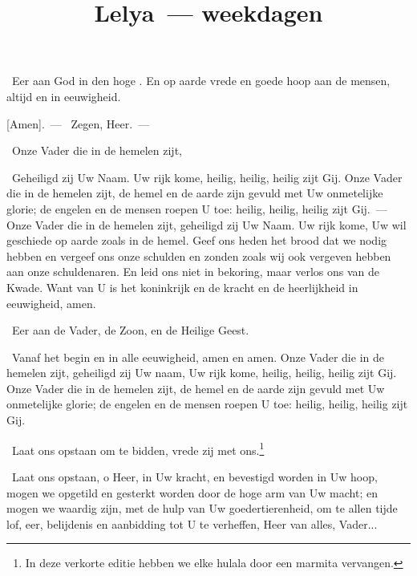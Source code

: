 \documentclass[12pt,twoside,a5paper]{article}
\begin{document}
\title{Lelya~--- weekdagen}
\author{}
\date{}
\maketitle

\footnotelayout{\ }


\begin{halfparskip}
  \cc~Eer aan God in den hoge . En op aarde vrede en goede hoop aan de mensen, altijd en in eeuwigheid.

  [Amen].~--- \rr~Zegen, Heer.~--- 

  \cc~Onze Vader die in de hemelen zijt,

  \rr~Geheiligd zij Uw Naam. Uw rijk kome, heilig, heilig, heilig zijt Gij. Onze Vader die in de hemelen zijt, de hemel en de aarde zijn gevuld met Uw onmetelijke glorie; de engelen en de mensen roepen U toe: heilig, heilig, heilig zijt Gij.~--- Onze Vader die in de hemelen zijt, geheiligd zij Uw Naam. Uw rijk kome, Uw wil geschiede op aarde zoals in de hemel. Geef ons heden het brood dat we nodig hebben en vergeef ons onze schulden en zonden zoals wij ook vergeven hebben aan onze schuldenaren. En leid ons niet in bekoring, maar verlos ons van de Kwade. Want van U is het koninkrijk en de kracht en de heerlijkheid in eeuwigheid, amen.

  \cc~Eer aan de Vader, de Zoon, en de Heilige Geest.

  \rr~Vanaf het begin en in alle eeuwigheid, amen en amen. Onze Vader die in de hemelen zijt, geheiligd zij Uw naam, Uw rijk kome, heilig, heilig, heilig zijt Gij. Onze Vader die in de hemelen zijt, de hemel en de aarde zijn gevuld met Uw onmetelijke glorie; de engelen en de mensen roepen U toe: heilig, heilig, heilig zijt Gij.

  \dd~Laat ons opstaan om te bidden, vrede zij met ons.\footnote{In deze verkorte editie hebben we elke hulala door een marmita vervangen.}

  \cc~Laat ons opstaan, o Heer, in Uw kracht, en bevestigd worden in Uw hoop, mogen we opgetild en gesterkt worden door de hoge arm van Uw macht; en mogen we waardig zijn, met de hulp van Uw goedertierenheid, om te allen tijde lof, eer, belijdenis en aanbidding tot U te verheffen, Heer van alles, Vader...
\end{halfparskip}
\end{document}
